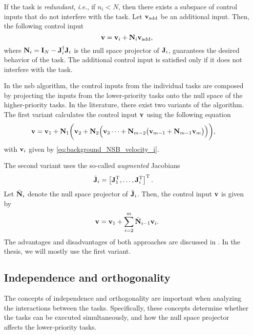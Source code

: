 If the task is \emph{redundant}, \emph{i.e.}, if $n_i < N$, then there exists a subspace of control inputs that do not interfere with the task.
Let $\mathbf{v}_{\rm add}$ be an additional input.
Then, the following control input
\begin{equation}
    \mathbf{v} = \mathbf{v}_i + \mathbf{N}_i \mathbf{v}_{\rm add},
\end{equation}
where $\mathbf{N}_i = \mathbf{I}_{N} - \mathbf{J}_i^{\dagger}\mathbf{J}_i$ is the null space projector of $\mathbf{J}_i$, guarantees the desired behavior of the task.
The additional control input is satisfied only if it does not interfere with the task.

In the \gls{nsb} algorithm, the control inputs from the individual tasks are composed by projecting the inputs from the lower-priority tasks onto the null space of the higher-priority tasks.
In the literature, there exist two variants of the algorithm.
The first variant calculates the control input $\mathbf{v}$ using the following equation
\begin{align}
    \mathbf{v} &= \mathbf{v}_{1} + \mathbf{N}_1 \biggl(\mathbf{v}_{2} + \mathbf{N}_2\Bigl(\mathbf{v}_3 \cdots + \mathbf{N}_{m-2}\bigl(\mathbf{v}_{m-1} + \mathbf{N}_{m-1}\mathbf{v}_m\bigr)\Bigr)\biggr),
\end{align}
with $\mathbf{v}_i$ given by \eqref{eq:background_NSB_velocity_i}.

The second variant uses the so-called \emph{augmented} Jacobians
\begin{align}
    \Bar{\mathbf{J}}_i &= \left[\mathbf{J}_1^{\mathrm{T}}, \ldots, \mathbf{J}_i^{\mathrm{T}}\right]^{\mathrm{T}}.
\end{align}
Let $\Bar{\mathbf{N}}_i$ denote the null space projector of $\Bar{\mathbf{J}}_i$.
Then, the control input $\mathbf{v}$ is given by
\begin{equation}
    \mathbf{v} = \mathbf{v}_1 + \sum_{i=2}^m \Bar{\mathbf{N}}_{i-1} \mathbf{v}_i.
\end{equation}
The advantages and disadvantages of both approaches are discussed in \cite{antonelli_stability_2008}.
In the thesis, we will mostly use the first variant.

\subsection{Independence and orthogonality}
The concepts of independence and orthogonality are important when analyzing the interactions between the tasks.
Specifically, these concepts determine whether the tasks can be executed simultaneously, and how the null space projector affects the lower-priority tasks.

